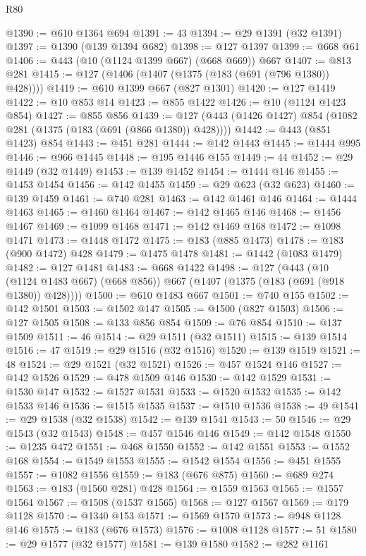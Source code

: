 \begin{lexlean}{R80}
\begin{coremodule}
@1390 := @610 @1364 @694
@1391 := 43
@1394 := @29 @1391 (@32 @1391)
@1397 := @1390 (@139 @1394 @682)
@1398 := @127 @1397
@1399 := @668 @61
@1406 := @443 (@10 (@1124 @1399 @667) (@668 @669)) @667
@1407 := @813 @281
@1415 := @127 (@1406 (@1407 (@1375 (@183 (@691 (@796 @1380)) @428))))
@1419 := @610 @1399 @667 (@827 @1301)
@1420 := @127 @1419
@1422 := @10 @853 @14
@1423 := @855 @1422
@1426 := @10 (@1124 @1423 @854)
@1427 := @855 @856
@1439 := @127 (@443 (@1426 @1427) @854 (@1082 @281 (@1375 (@183 (@691 (@866 @1380)) @428))))
@1442 := @443 (@851 @1423) @854
@1443 := @451 @281
@1444 := @142 @1443
@1445 := @1444 @995
@1446 := @966 @1445
@1448 := @195 @1446 @155
@1449 := 44
@1452 := @29 @1449 (@32 @1449)
@1453 := @139 @1452
@1454 := @1444 @146
@1455 := @1453 @1454
@1456 := @142 @1455
@1459 := @29 @623 (@32 @623)
@1460 := @139 @1459
@1461 := @740 @281
@1463 := @142 @1461 @146
@1464 := @1444 @1463
@1465 := @1460 @1464
@1467 := @142 @1465 @146
@1468 := @1456 @1467
@1469 := @1099 @1468
@1471 := @142 @1469 @168
@1472 := @1098 @1471
@1473 := @1448 @1472
@1475 := @183 (@885 @1473)
@1478 := @183 (@900 @1472) @428
@1479 := @1475 @1478
@1481 := @1442 (@1083 @1479)
@1482 := @127 @1481
@1483 := @668 @1422
@1498 := @127
    (@443 (@10 (@1124 @1483 @667) (@668 @856)) @667 (@1407 (@1375 (@183 (@691 (@918 @1380)) @428))))
@1500 := @610 @1483 @667
@1501 := @740 @155
@1502 := @142 @1501
@1503 := @1502 @147
@1505 := @1500 (@827 @1503)
@1506 := @127 @1505
@1508 := @133 @856 @854
@1509 := @76 @854
@1510 := @137 @1509
@1511 := 46
@1514 := @29 @1511 (@32 @1511)
@1515 := @139 @1514
@1516 := 47
@1519 := @29 @1516 (@32 @1516)
@1520 := @139 @1519
@1521 := 48
@1524 := @29 @1521 (@32 @1521)
@1526 := @457 @1524 @146
@1527 := @142 @1526
@1529 := @478 @1509 @146
@1530 := @142 @1529
@1531 := @1530 @147
@1532 := @1527 @1531
@1533 := @1520 @1532
@1535 := @142 @1533 @146
@1536 := @1515 @1535
@1537 := @1510 @1536
@1538 := 49
@1541 := @29 @1538 (@32 @1538)
@1542 := @139 @1541
@1543 := 50
@1546 := @29 @1543 (@32 @1543)
@1548 := @457 @1546 @146
@1549 := @142 @1548
@1550 := @1235 @472
@1551 := @468 @1550
@1552 := @142 @1551
@1553 := @1552 @168
@1554 := @1549 @1553
@1555 := @1542 @1554
@1556 := @451 @1555
@1557 := @1082 @1556
@1559 := @183 (@676 @875)
@1560 := @689 @274
@1563 := @183 (@1560 @281) @428
@1564 := @1559 @1563
@1565 := @1557 @1564
@1567 := @1508 (@1537 @1565)
@1568 := @127 @1567
@1569 := @179 @1128
@1570 := @1340 @153
@1571 := @1569 @1570
@1573 := @948 @1128 @146
@1575 := @183 (@676 @1573)
@1576 := @1008 @1128
@1577 := 51
@1580 := @29 @1577 (@32 @1577)
@1581 := @139 @1580
@1582 := @282 @1161

\end{coremodule}
\end{lexlean}
